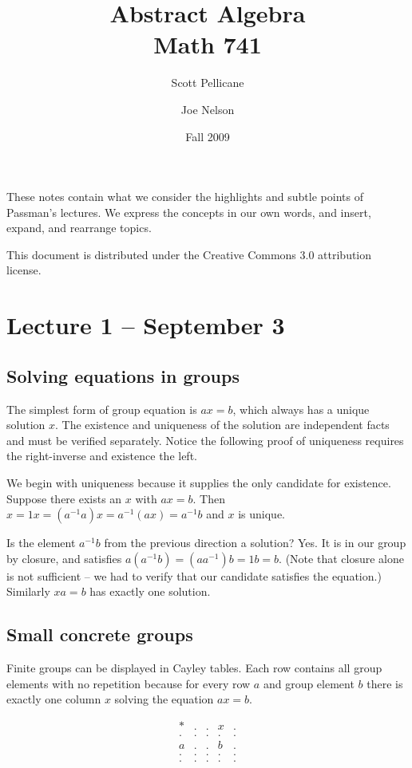 \documentclass[letter]{article}
\begin{document}
\title{Abstract Algebra\\
Math 741}
\author{Scott Pellicane \and Joe Nelson}
\date{Fall 2009}
\maketitle

These notes contain what we consider the highlights and subtle points of Passman's lectures. We express the concepts in our own words, and insert, expand, and rearrange topics.

This document is distributed under the Creative Commons 3.0 attribution license.

\section{Lecture 1 -- September 3}

\subsection{Solving equations in groups}

The simplest form of group equation is $ax = b$, which always has a unique solution $x$. The existence and uniqueness of the solution are independent facts and must be verified separately. Notice the following proof of uniqueness requires the right-inverse and existence the left.

We begin with uniqueness because it supplies the only candidate for existence.  Suppose there exists an $x$ with $ax = b$. Then $x = 1x = (a^{-1}a)x = a^{-1}(ax) = a^{-1}b$ and $x$ is unique.

Is the element $a^{-1}b$ from the previous direction a solution? Yes. It is in our group by closure, and satisfies $a(a^{-1}b) = (aa^{-1})b = 1b = b$.  (Note that closure alone is not sufficient -- we had to verify that our candidate satisfies the equation.) Similarly $xa = b$ has exactly one solution.

\subsection{Small concrete groups}

Finite groups can be displayed in Cayley tables. Each row contains all group elements with no repetition because for every row $a$ and group element $b$ there is exactly one column $x$ solving the equation $ax = b$.

\[
\begin{array}{r|*{5}{r}}
* & . & . & x & . \\
\hline
. & . & . & . & . \\
a & . & . & b & . \\
. & . & . & . & . \\
. & . & . & . & . \\
\end{array}
\]
\end{document}
